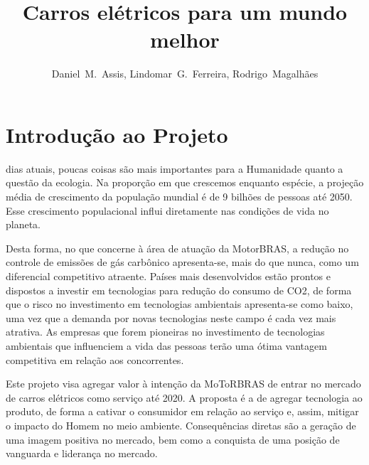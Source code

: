 \documentclass[12pt,journal,compsoc]{IEEEtran}
\begin{document}
\title{Carros elétricos para um mundo melhor}
\author{
  Daniel~M.~Assis, 
  Lindomar~G.~Ferreira, 
  Rodrigo~Magalhães
}


\maketitle

\IEEEdisplaynotcompsoctitleabstractindextext
\IEEEpeerreviewmaketitle


\section{Introdução ao Projeto}

 dias atuais, poucas coisas são mais importantes para a Humanidade quanto a questão da ecologia. Na proporção em que crescemos enquanto espécie, a projeção média de crescimento da população mundial é de 9 bilhões de pessoas até 2050. \cite{wwf_living_2013} Esse crescimento populacional influi diretamente nas condições de vida no planeta.

Desta forma, no que concerne à área de atuação da MotorBRAS, a redução no controle de emissões de gás carbônico apresenta-se, mais do que nunca, como um diferencial competitivo atraente. Países mais desenvolvidos estão prontos e dispostos a investir em tecnologias para redução do consumo de CO2, de forma que o risco no investimento em tecnologias ambientais apresenta-se como baixo, uma vez que a demanda por novas tecnologias neste campo é cada vez mais atrativa. As empresas que forem pioneiras no investimento de tecnologias ambientais que influenciem a vida das pessoas terão uma ótima vantagem competitiva em relação aos concorrentes. 

Este projeto visa agregar valor à intenção da MoToRBRAS de entrar no mercado de carros elétricos como serviço até 2020. A proposta é a de agregar tecnologia ao produto, de forma a cativar o consumidor em relação ao serviço e, assim, mitigar o impacto do Homem no meio ambiente. Consequências diretas são a geração de uma imagem positiva no mercado, bem como a conquista de uma posição de vanguarda e liderança no mercado. 
\end{document}
